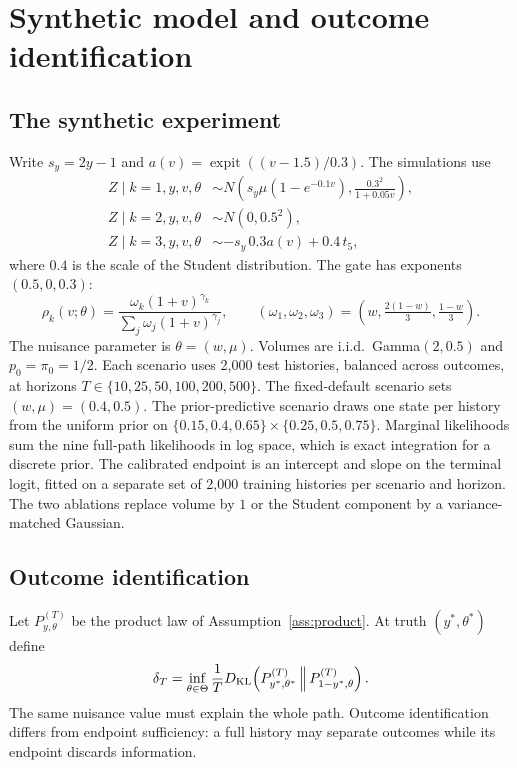 \section{Synthetic model and outcome identification}
\label{app:synthetic}
\subsection{The synthetic experiment}
Write $s_y=2y-1$ and $a(v)=\operatorname{expit}((v-1.5)/0.3)$. The simulations use
\begin{align}
 Z\mid k=1,y,v,\theta&\sim N\!\left(s_y\mu(1-e^{-0.1v}),\frac{0.3^2}{1+0.05v}\right),\nonumber\\
 Z\mid k=2,y,v,\theta&\sim N(0,0.5^2),\label{eq:example}\\
 Z\mid k=3,y,v,\theta&\sim -s_y\,0.3a(v)+0.4\,t_5,\nonumber
\end{align}
where $0.4$ is the scale of the Student distribution. The gate has exponents $(0.5,0,0.3)$:
\[
 \rho_k(v;\theta)=\frac{\omega_k(1+v)^{\gamma_k}}{\sum_j\omega_j(1+v)^{\gamma_j}},\qquad
 (\omega_1,\omega_2,\omega_3)=\left(w,\tfrac{2(1-w)}3,\tfrac{1-w}3\right).
\]
The nuisance parameter is $\theta=(w,\mu)$. Volumes are i.i.d.\ Gamma$(2,0.5)$ and $p_0=\pi_0=1/2$. Each scenario uses 2,000 test histories, balanced across outcomes, at horizons $T\in\{10,25,50,100,200,500\}$. The fixed-default scenario sets $(w,\mu)=(0.4,0.5)$. The prior-predictive scenario draws one state per history from the uniform prior on $\{0.15,0.4,0.65\}\times\{0.25,0.5,0.75\}$. Marginal likelihoods sum the nine full-path likelihoods in log space, which is exact integration for a discrete prior. The calibrated endpoint is an intercept and slope on the terminal logit, fitted on a separate set of 2,000 training histories per scenario and horizon. The two ablations replace volume by $1$ or the Student component by a variance-matched Gaussian.

\subsection{Outcome identification}
Let $P_{y,\theta}^{(T)}$ be the product law of Assumption~\ref{ass:product}. At truth $(y^*,\theta^*)$ define
\begin{equation}
 \delta_T=\inf_{\theta\in\Theta}\frac1TD_{\mathrm{KL}}\!\left(P_{y^*,\theta^*}^{(T)}\,\middle\|\,P_{1-y^*,\theta}^{(T)}\right).
 \label{eq:gap}
\end{equation}
The same nuisance value must explain the whole path. Outcome identification differs from endpoint sufficiency: a full history may separate outcomes while its endpoint discards information.

